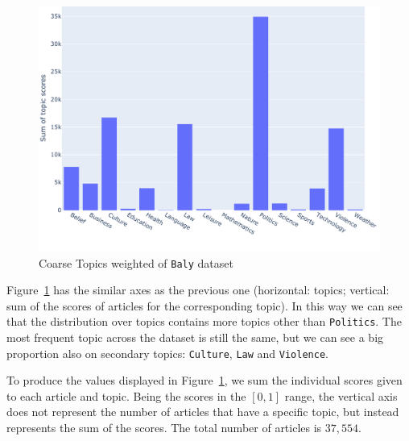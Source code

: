 \begin{figure}[!htbp]
    \centering
    \includegraphics[width=\linewidth]{figures/baly_coarse_weighted.pdf}
    \caption{Coarse Topics weighted of \texttt{Baly} dataset}
    \label{fig:baly_coarse_weighted}
\end{figure}

Figure~\ref{fig:baly_coarse_weighted} has the similar axes as the previous one (horizontal: topics; vertical: sum of the scores of articles for the corresponding topic).
In this way we can see that the distribution over topics contains more topics other than \texttt{Politics}.
The most frequent topic across the dataset is still the same, but we can see a big proportion also on secondary topics: \texttt{Culture}, \texttt{Law} and \texttt{Violence}.

To produce the values displayed in Figure~\ref{fig:baly_coarse_weighted}, we sum the individual scores given to each article and topic. Being the scores in the $[0,1]$ range, the vertical axis does not represent the number of articles that have a specific topic, but instead represents the sum of the scores. The total number of articles is $37,554$.


